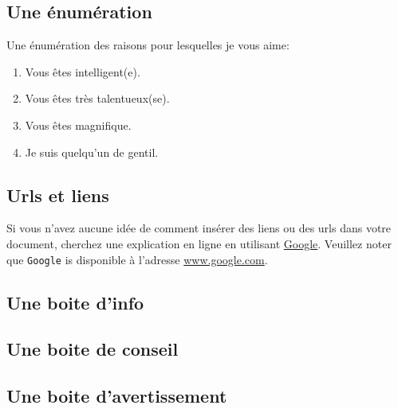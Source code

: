 \documentclass{42-fr}
\begin{document}
        \subsection{Une \'enum\'eration}

            Une \'enum\'eration des raisons pour lesquelles je vous
            aime:\\

            \begin{enumerate}\itemsep7pt
                \item Vous \^etes intelligent(e).
                \item Vous \^etes tr\`es talentueux(se).
                \item Vous \^etes magnifique.
                \item Je suis quelqu'un de gentil.
            \end{enumerate}


        \subsection{Urls et liens}

            Si vous n'avez aucune id\'ee de comment ins\'erer des
            liens ou des urls dans votre document, cherchez une
            explication en ligne en utilisant
            \href{www.google.com}{Google}. Veuillez noter que
            \texttt{Google} is disponible \`a l'adresse
            \url{www.google.com}.


        \newpage


        \subsection{Une boite d'info}



        \subsection{Une boite de conseil}



        \subsection{Une boite d'avertissement}
\end{document}
